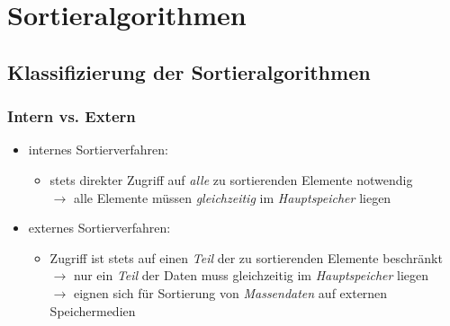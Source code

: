 \documentclass{lehramt-informatik-haupt}
\begin{document}

\chapter{Sortieralgorithmen}

\begin{liQuellen}
\cite{wiki:sortierverfahren}
\end{liQuellen}

\section{Klassifizierung der Sortieralgorithmen}

%

\subsection{Intern vs. Extern}

\cite[Seite 34]{aud:fs:tafeluebung-11}

\begin{itemize}

%

\item internes Sortierverfahren:

\begin{itemize}
\item stets direkter Zugriff auf \emph{alle} zu sortierenden Elemente
notwendig\\
%
$\rightarrow$ alle Elemente müssen \emph{gleichzeitig} im
\emph{Hauptspeicher} liegen
\end{itemize}

%

\item externes Sortierverfahren:

\begin{itemize}
\item Zugriff ist stets auf einen \emph{Teil} der zu sortierenden
Elemente beschränkt\\
%
$\rightarrow$ nur ein \emph{Teil} der Daten muss gleichzeitig im
\emph{Hauptspeicher} liegen\\
%
$\rightarrow$ eignen sich für Sortierung von \emph{Massendaten} auf
externen Speichermedien
\end{itemize}

\end{itemize}
\end{document}
